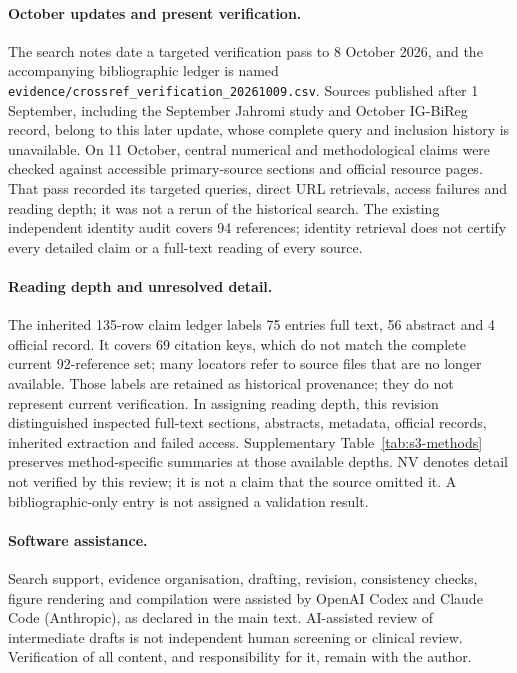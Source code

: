 \documentclass[11pt,a4paper]{article}
\begin{document}
\paragraph{October updates and present verification.} The search notes date a targeted verification pass to 8 October 2026, and the accompanying bibliographic ledger is named \texttt{evidence/\allowbreak crossref\_verification\_\allowbreak 20261009.csv}. Sources published after 1 September, including the September Jahromi study and October IG-BiReg record, belong to this later update, whose complete query and inclusion history is unavailable. On 11 October, central numerical and methodological claims were checked against accessible primary-source sections and official resource pages. That pass recorded its targeted queries, direct URL retrievals, access failures and reading depth; it was not a rerun of the historical search. The existing independent identity audit covers 94 references; identity retrieval does not certify every detailed claim or a full-text reading of every source.

\paragraph{Reading depth and unresolved detail.} The inherited 135-row claim ledger labels 75 entries full text, 56 abstract and 4 official record. It covers 69 citation keys, which do not match the complete current 92-reference set; many locators refer to source files that are no longer available. Those labels are retained as historical provenance; they do not represent current verification. In assigning reading depth, this revision distinguished inspected full-text sections, abstracts, metadata, official records, inherited extraction and failed access. Supplementary Table~\ref{tab:s3-methods} preserves method-specific summaries at those available depths. NV denotes detail not verified by this review; it is not a claim that the source omitted it. A bibliographic-only entry is not assigned a validation result.

\paragraph{Software assistance.} Search support, evidence organisation, drafting, revision, consistency checks, figure rendering and compilation were assisted by OpenAI Codex and Claude Code (Anthropic), as declared in the main text. AI-assisted review of intermediate drafts is not independent human screening or clinical review. Verification of all content, and responsibility for it, remain with the author.
\end{document}
